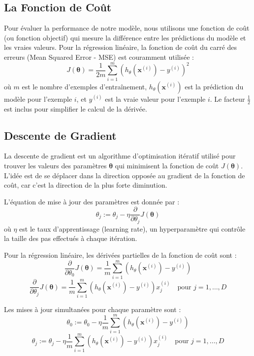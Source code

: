 \documentclass{article}
\begin{document}
\subsection{La Fonction de Coût}
Pour évaluer la performance de notre modèle, nous utilisons une fonction de coût (ou fonction objectif) qui mesure la différence entre les prédictions du modèle et les vraies valeurs. Pour la régression linéaire, la fonction de coût du carré des erreurs (Mean Squared Error - MSE) est couramment utilisée :
$$J(\mathbf{\theta}) = \frac{1}{2m} \sum_{i=1}^m (h_\theta(\mathbf{x}^{(i)}) - y^{(i)})^2$$
où $m$ est le nombre d'exemples d'entraînement, $h_\theta(\mathbf{x}^{(i)})$ est la prédiction du modèle pour l'exemple $i$, et $y^{(i)}$ est la vraie valeur pour l'exemple $i$. Le facteur $\frac{1}{2}$ est inclus pour simplifier le calcul de la dérivée.

\subsection{Descente de Gradient}
La descente de gradient est un algorithme d'optimisation itératif utilisé pour trouver les valeurs des paramètres $\mathbf{\theta}$ qui minimisent la fonction de coût $J(\mathbf{\theta})$. L'idée est de se déplacer dans la direction opposée au gradient de la fonction de coût, car c'est la direction de la plus forte diminution.

L'équation de mise à jour des paramètres est donnée par :
$$\theta_j := \theta_j - \eta \frac{\partial}{\partial \theta_j} J(\mathbf{\theta})$$
où $\eta$ est le taux d'apprentissage (learning rate), un hyperparamètre qui contrôle la taille des pas effectués à chaque itération.

Pour la régression linéaire, les dérivées partielles de la fonction de coût sont :
$$\frac{\partial}{\partial \theta_0} J(\mathbf{\theta}) = \frac{1}{m} \sum_{i=1}^m (h_\theta(\mathbf{x}^{(i)}) - y^{(i)})$$
$$\frac{\partial}{\partial \theta_j} J(\mathbf{\theta}) = \frac{1}{m} \sum_{i=1}^m (h_\theta(\mathbf{x}^{(i)}) - y^{(i)}) x_j^{(i)} \quad \text{pour } j=1, \dots, D$$

Les mises à jour simultanées pour chaque paramètre sont :
$$\theta_0 := \theta_0 - \eta \frac{1}{m} \sum_{i=1}^m (h_\theta(\mathbf{x}^{(i)}) - y^{(i)})$$
$$\theta_j := \theta_j - \eta \frac{1}{m} \sum_{i=1}^m (h_\theta(\mathbf{x}^{(i)}) - y^{(i)}) x_j^{(i)} \quad \text{pour } j=1, \dots, D$$
\end{document}
